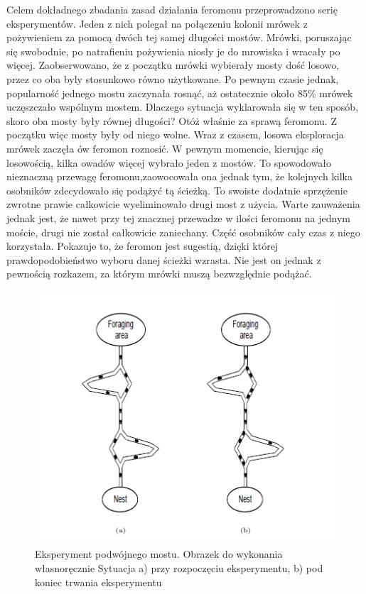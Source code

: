\documentclass[printmode, openany, oneside, eng]{mgr}
\begin{document}
\newline Celem dokładnego zbadania zasad działania feromonu przeprowadzono serię eksperymentów. Jeden z nich polegał na połączeniu kolonii mrówek z pożywieniem za pomocą dwóch tej samej długości mostów. Mrówki, poruszając się swobodnie, po natrafieniu pożywienia niosły je do mrowiska i wracały po więcej. Zaobserwowano, że z początku mrówki wybierały mosty dość losowo, przez co oba byly stosunkowo równo użytkowane. Po pewnym czasie jednak, popularność jednego mostu zaczynała rosnąć, aż ostatecznie około 85\% mrówek uczęszczało wspólnym mostem. Dlaczego sytuacja wyklarowała się w ten sposób, skoro oba mosty były równej długości? Otóż właśnie za sprawą feromonu. Z początku więc mosty były od niego wolne. Wraz z czasem, losowa eksploracja mrówek zaczęła ów feromon roznosić. W pewnym momencie, kierując się losowością, kilka owadów więcej wybrało jeden z mostów. To spowodowało nieznaczną przewagę feromonu,zaowocowała ona jednak tym, że kolejnych kilka osobników zdecydowało się podążyć tą ścieżką. To swoiste dodatnie sprzężenie zwrotne prawie całkowicie wyeliminowało drugi most z użycia. Warte zauważenia jednak jest, że nawet przy tej znacznej przewadze w ilości feromonu na jednym moście, drugi nie został całkowicie zaniechany. Część osobników cały czas z niego korzystała. Pokazuje to, że feromon jest sugestią, dzięki której prawdopodobieństwo wyboru danej ścieżki wzrasta. Nie jest on jednak z pewnością rozkazem, za którym mrówki muszą bezwzględnie podążać.
\begin{figure}[H]
\centering
\includegraphics[scale=1]{img/01trasa.png}
\caption{Eksperyment podwójnego mostu. Obrazek do wykonania własnoręcznie Sytuacja a) przy rozpoczęciu eksperymentu, b) pod koniec trwania eksperymentu}
\label{fig:eksperyment}
\end{figure}
\end{document}
